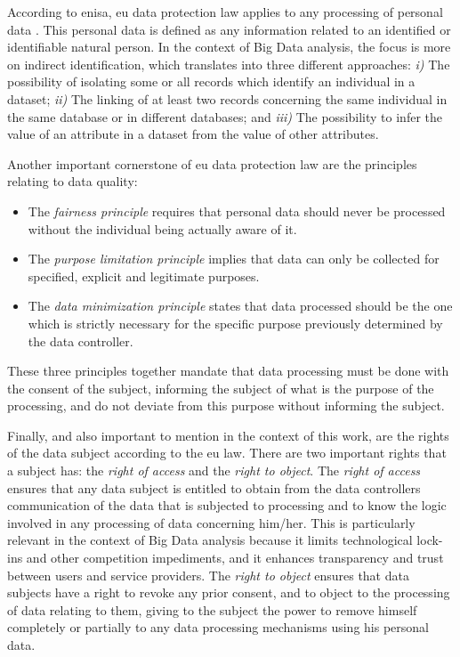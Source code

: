  According to \ac{enisa}, \ac{eu} data protection law applies to any processing of personal data \cite{DAcquisto2015}. This personal data is defined as any information related to an identified or identifiable natural person. In the context of Big Data analysis, the focus is more on indirect identification, which translates into three different approaches: \emph{i)} The possibility of isolating some or all records which identify an individual in a dataset; \emph{ii)} The linking of at least two records concerning the same individual in the same database or in different databases; and  \emph{iii)} The possibility to infer the value of an attribute in a dataset from the value of other attributes.



Another important cornerstone of \ac{eu} data protection law are the principles relating to data quality:

\begin{itemize}

    \item The \textit{fairness principle} requires that personal data should never be processed without the individual being actually aware of it.

    \item The \textit{purpose limitation principle} implies that data can only be collected for specified, explicit and legitimate purposes.

    \item The \textit{data minimization principle} states that data processed should be the one which is strictly necessary for the specific purpose previously determined by the data controller.
\end{itemize}


These three principles together mandate that data processing must be done with the consent of the subject, informing the subject of what is the purpose of the processing, and do not deviate from this purpose without informing the subject.

Finally, and also important to mention in the context of this work, are the rights of the data subject according to the \ac{eu} law. There are two important rights that a subject has: the \textit{right of access} and the \textit{right to object}.
The \textit{right of access} ensures that any data subject is entitled to obtain from the data controllers communication of the data that is subjected to processing and to know the logic involved in any processing of data concerning him/her.
This is particularly relevant in the context of Big Data analysis because it limits technological lock-ins and other competition impediments, and it enhances transparency and trust between users and service providers.
The \textit{right to object} ensures that data subjects have a right to revoke any prior consent, and to object to the processing of data relating to them, giving to the subject the power to remove himself completely or partially to any data processing mechanisms using his personal data.


